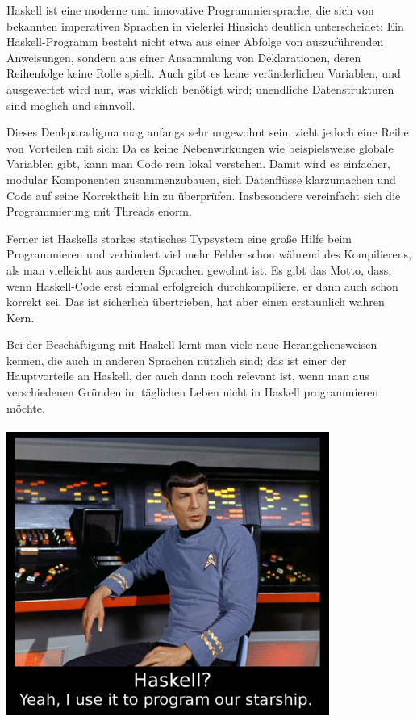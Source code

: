 \documentclass[a4paper,ngerman,landscape]{scrartcl}
\begin{document}
\setlength{\columnsep}{2.5em}
\begin{multicols}{2}
\setlength\parskip{\medskipamount}
\Large
Haskell ist eine moderne und innovative Programmiersprache, die sich von
bekannten imperativen Sprachen in vielerlei Hinsicht deutlich unterscheidet:
Ein Haskell-Programm besteht nicht etwa aus einer Abfolge von auszuführenden
Anweisungen, sondern aus einer Ansammlung von Deklarationen, deren
Reihenfolge keine Rolle spielt. Auch gibt es keine veränderlichen Variablen,
und ausgewertet wird nur, was wirklich benötigt wird; unendliche
Datenstrukturen sind möglich und sinnvoll.

Dieses Denkparadigma mag anfangs sehr ungewohnt sein, zieht jedoch eine Reihe
von Vorteilen mit sich: Da es keine Nebenwirkungen wie beispielsweise globale
Variablen gibt, kann man Code rein lokal verstehen. Damit wird es einfacher,
modular Komponenten zusammenzubauen, sich Datenflüsse klarzumachen und Code
auf seine Korrektheit hin zu überprüfen. Insbesondere vereinfacht sich die
Programmierung mit Threads enorm.

Ferner ist Haskells starkes statisches Typsystem eine große Hilfe beim
Programmieren und verhindert viel mehr Fehler schon während des Kompilierens,
als man vielleicht aus anderen Sprachen gewohnt ist. Es gibt das Motto, dass,
wenn Haskell-Code erst einmal erfolgreich durchkompiliere, er dann auch schon
korrekt sei. Das ist sicherlich übertrieben, hat aber einen erstaunlich
wahren Kern.

Bei der Beschäftigung mit Haskell lernt man viele neue Herangehensweisen kennen, die
auch in anderen Sprachen nützlich sind; das ist einer der Hauptvorteile an
Haskell, der auch dann noch relevant ist, wenn man aus verschiedenen Gründen
im täglichen Leben nicht in Haskell programmieren möchte.
\ \\
\ \\

\vfill
\centering
\includegraphics[height=0.5\textheight]{haskell-spock}
\par
\end{multicols}
\end{document}
